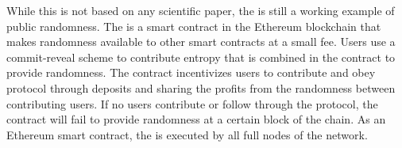 While this is not based on any scientific paper, the  is still a working example of public randomness.
The  is a smart contract in the Ethereum blockchain that makes randomness available to other smart contracts at a small fee.
Users use a commit-reveal scheme to contribute entropy that is combined in the contract to provide randomness.
The contract incentivizes users to contribute and obey protocol through deposits and sharing the profits from the randomness between contributing users.
If no users contribute or follow through the protocol, the contract will fail to provide randomness at a certain block of the chain.
As an Ethereum smart contract, the  is executed by all full nodes of the network.
